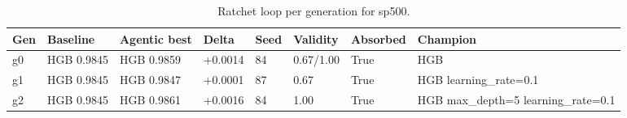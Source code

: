 \begin{table}[H]
\centering\small
\caption{Ratchet loop per generation for sp500.}
\label{tab:ratchet-generations-ratchet-ledger-sp500}
\begin{tabular}{llllllll}
\toprule
Gen & Baseline & Agentic best & Delta & Seed & Validity & Absorbed & Champion \\
\midrule
g0 & HGB 0.9845 & HGB 0.9859 & +0.0014 & 84 & 0.67/1.00 & True & HGB \\
g1 & HGB 0.9845 & HGB 0.9847 & +0.0001 & 87 & 0.67 & True & HGB learning\_rate=0.1 \\
g2 & HGB 0.9845 & HGB 0.9861 & +0.0016 & 84 & 1.00 & True & HGB max\_depth=5 learning\_rate=0.1 \\
\bottomrule
\end{tabular}
\end{table}
